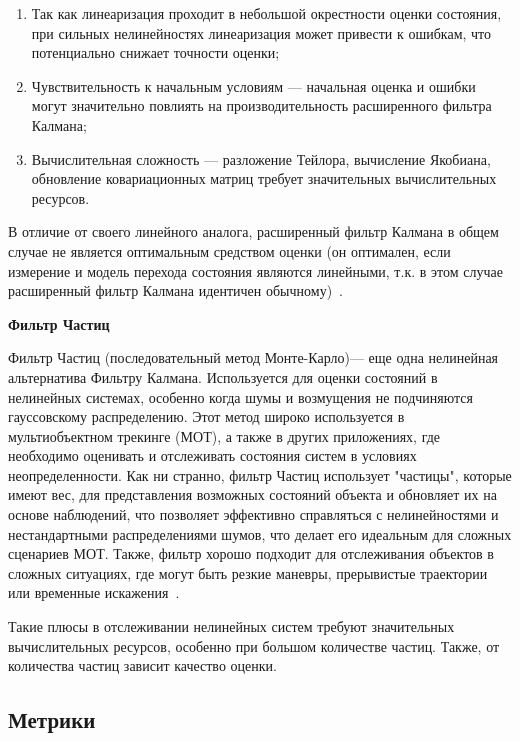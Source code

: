 \begin{enumerate}

	\item Так как линеаризация проходит в небольшой окрестности оценки состояния, при сильных нелинейностях линеаризация может привести к ошибкам, что потенциально снижает точности оценки;
	
	\item Чувствительность к начальным условиям --- начальная оценка и ошибки могут значительно повлиять на производительность расширенного фильтра Калмана;
	
	\item Вычислительная сложность --- разложение Тейлора, вычисление Якобиана, обновление ковариационных матриц требует значительных вычислительных ресурсов.
	
\end{enumerate}

В отличие от своего линейного аналога, расширенный фильтр Калмана в общем случае не является оптимальным средством оценки (он оптимален, если измерение и модель перехода состояния являются линейными, т.к. в этом случае расширенный фильтр Калмана идентичен обычному)~\cite{Mitzel2011, ExtendetKalmanFilter2023}. 
	
\textbf {Фильтр Частиц}

Фильтр Частиц (последовательный метод Монте-Карло)--- еще одна нелинейная альтернатива Фильтру Калмана. Используется для оценки состояний в нелинейных системах, особенно когда шумы и возмущения не подчиняются гауссовскому распределению. Этот метод широко используется в мультиобъектном трекинге (МОТ), а также в других приложениях, где необходимо оценивать и отслеживать состояния систем в условиях неопределенности. Как ни странно, фильтр Частиц использует "частицы", которые имеют вес, для представления возможных состояний объекта и обновляет их на основе наблюдений, что позволяет эффективно справляться с нелинейностями и нестандартными распределениями шумов, что делает его идеальным для сложных сценариев МОТ. Также, фильтр хорошо подходит для отслеживания объектов в сложных ситуациях, где могут быть резкие маневры, прерывистые траектории или временные искажения~\cite{Yang2009}.

Такие плюсы в отслеживании нелинейных систем требуют значительных вычислительных ресурсов, особенно при большом количестве частиц. Также, от количества частиц зависит качество оценки.

\subsection{Метрики}

